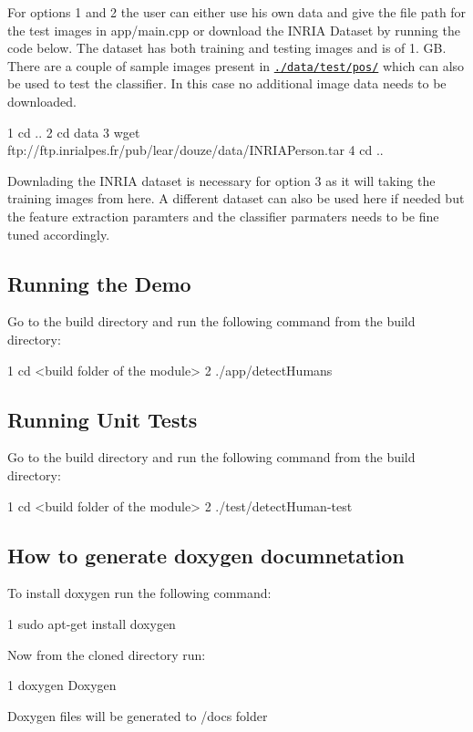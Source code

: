 For options 1 and 2 the user can either use his own data and give the file path for the test images in app/main.\+cpp or download the I\+N\+R\+IA Dataset by running the code below. The dataset has both training and testing images and is of 1. GB. There are a couple of sample images present in \href{https://github.com/anirudhtopiwala/Human_Detector/tree/master/data/test/pos}{\tt ./data/test/pos/} which can also be used to test the classifier. In this case no additional image data needs to be downloaded. 
\begin{DoxyCode}
1 cd .. 
2 cd data
3 wget ftp://ftp.inrialpes.fr/pub/lear/douze/data/INRIAPerson.tar
4 cd ..
\end{DoxyCode}
 Downlading the I\+N\+R\+IA dataset is necessary for option 3 as it will taking the training images from here. A different dataset can also be used here if needed but the feature extraction paramters and the classifier parmaters needs to be fine tuned accordingly.

\subsection*{Running the Demo}

Go to the build directory and run the following command from the build directory\+:


\begin{DoxyCode}
1 cd <build folder of the module>
2 ./app/detectHumans 
\end{DoxyCode}


\subsection*{Running Unit Tests}

Go to the build directory and run the following command from the build directory\+: 
\begin{DoxyCode}
1 cd <build folder of the module>
2 ./test/detectHuman-test 
\end{DoxyCode}
 \subsection*{How to generate doxygen documnetation}

To install doxygen run the following command\+: 
\begin{DoxyCode}
1 sudo apt-get install doxygen
\end{DoxyCode}
 Now from the cloned directory run\+: 
\begin{DoxyCode}
1 doxygen Doxygen
\end{DoxyCode}
 Doxygen files will be generated to /docs folder

